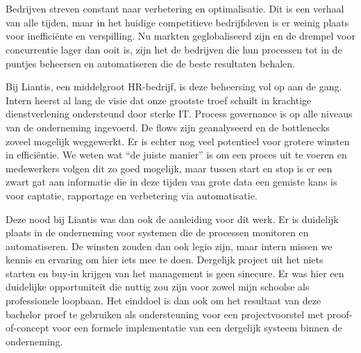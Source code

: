
\chapter{}%
\label{ch:inleiding}
\section{}%
\label{sec:probleemstelling}

Bedrijven streven constant naar verbetering en optimalisatie. Dit is een verhaal van alle tijden, maar in het huidige competitieve bedrijfsleven is er weinig plaats voor inefficiënte en verspilling. Nu markten geglobaliseerd zijn en de drempel voor concurrentie lager dan ooit is, zijn het de bedrijven die hun processen tot in de puntjes beheersen en automatiseren die de beste resultaten behalen.\newline

Bij Liantis, een middelgroot HR-bedrijf, is deze beheersing vol op aan de gang. Intern heerst al lang de visie dat onze grootste troef schuilt in krachtige dienstverlening ondersteund door sterke IT. Process governance is op alle niveaus van de onderneming ingevoerd. De flows zijn geanalyseerd en de bottlenecks zoveel mogelijk weggewerkt. Er is echter nog veel potentieel voor grotere winsten in efficiëntie. We weten wat “de juiste manier” is om een proces uit te voeren en medewerkers volgen dit zo goed mogelijk, maar tussen start en stop is er een zwart gat aan informatie die in deze tijden van grote data een gemiste kans is voor captatie, rapportage en verbetering via automatisatie.\newline 

Deze nood bij Liantis was dan ook de aanleiding voor dit werk. Er is duidelijk plaats in de onderneming voor systemen die de processen monitoren en automatiseren. De winsten zouden dan ook legio zijn, maar intern missen we kennis en ervaring om hier iets mee te doen. Dergelijk project uit het niets starten en buy-in krijgen van het management is geen sinecure. Er was hier een duidelijke opportuniteit die nuttig zou zijn voor zowel mijn schoolse als professionele loopbaan. Het einddoel is dan ook om het resultaat van deze bachelor proef te gebruiken als ondersteuning voor een projectvoorstel met proof-of-concept voor een formele implementatie van een dergelijk systeem binnen de onderneming.
